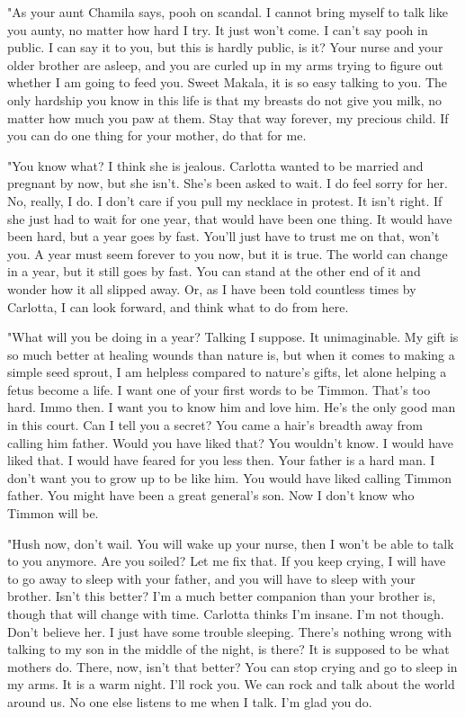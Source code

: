 \documentclass{article}
\begin{document}
"As your aunt Chamila says, pooh on scandal. I cannot bring myself to talk like you aunty, no matter how hard I try. It just won't come. I can't say pooh in public. I can say it to you, but this is hardly public, is it? Your nurse and your older brother are asleep, and you are curled up in my arms trying to figure out whether I am going to feed you. Sweet Makala, it is so easy talking to you. The only hardship you know in this life is that my breasts do not give you milk, no matter how much you paw at them. Stay that way forever, my precious child. If you can do one thing for your mother, do that for me.

"You know what? I think she is jealous. Carlotta wanted to be married and pregnant by now, but she isn't. She's been asked to wait. I do feel sorry for her. No, really, I do. I don't care if you pull my necklace in protest. It isn't right. If she just had to wait for one year, that would have been one thing. It would have been hard, but a year goes by fast. You'll just have to trust me on that, won't you. A year must seem forever to you now, but it is true. The world can change in a year, but it still goes by fast. You can stand at the other end of it and wonder how it all slipped away. Or, as I have been told countless times by Carlotta, I can look forward, and think what to do from here. 

"What will you be doing in a year? Talking I suppose. It unimaginable. My gift is so much better at healing wounds than nature is, but when it comes to making a simple seed sprout, I am helpless compared to nature's gifts, let alone helping a fetus become a life. I want one of your first words to be Timmon. That's too hard. Immo then. I want you to know him and love him. He's the only good man in this court. Can I tell you a secret? You came a hair's breadth away from calling him father. Would you have liked that? You wouldn't know. I would have liked that. I would have feared for you less then. Your father is a hard man. I don't want you to grow up to be like him. You would have liked calling Timmon father. You might have been a great general's son. Now I don't know who Timmon will be.

"Hush now, don't wail. You will wake up your nurse, then I won't be able to talk to you anymore. Are you soiled? Let me fix that. If you keep crying, I will have to go away to sleep with your father, and you will have to sleep with your brother. Isn't this better? I'm a much better companion than your brother is, though that will change with time. Carlotta thinks I'm insane. I'm not though. Don't believe her. I just have some trouble sleeping. There's nothing wrong with talking to my son in the middle of the night, is there? It is supposed to be what mothers do. There, now, isn't that better? You can stop crying and go to sleep in my arms. It is a warm night. I'll rock you. We can rock and talk about the world around us. No one else listens to me when I talk. I'm glad you do.
\end{document}
